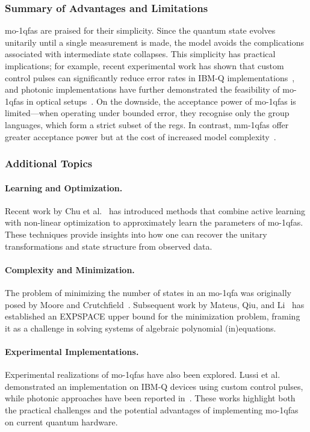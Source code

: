 \subsubsection{Summary of Advantages and Limitations}
\glspl{mo-1qfa} are praised for their simplicity. Since the quantum state evolves unitarily until a single measurement is made, the model avoids the complications associated with intermediate state collapses. This simplicity has practical implications; for example, recent experimental work has shown that custom control pulses can significantly reduce error rates in IBM-Q implementations~\cite{lussi2024implementing}, and photonic implementations have further demonstrated the feasibility of \glspl{mo-1qfa} in optical setups~\cite{candeloro2021enhanced}. On the downside, the acceptance power of \glspl{mo-1qfa} is limited—when operating under bounded error, they recognise only the group languages, which form a strict subset of the \glspl{reg}. In contrast, \glspl{mm-1qfa} offer greater acceptance power but at the cost of increased model complexity~\cite{kondacs1997power,berzicna2001ambainis}.


\subsubsection{Additional Topics}
\paragraph{Learning and Optimization.} Recent work by Chu et al.~\cite{chu2023approximately} has introduced methods that combine active learning with non-linear optimization to approximately learn the parameters of \glspl{mo-1qfa}. These techniques provide insights into how one can recover the unitary transformations and state structure from observed data.

\paragraph{Complexity and Minimization.} The problem of minimizing the number of states in an \gls{mo-1qfa} was originally posed by Moore and Crutchfield~\cite{moore2000quantum}. Subsequent work by Mateus, Qiu, and Li~\cite{mateus2012complexity} has established an EXPSPACE upper bound for the minimization problem, framing it as a challenge in solving systems of algebraic polynomial (in)equations.

\paragraph{Experimental Implementations.} Experimental realizations of \glspl{mo-1qfa} have also been explored. Lussi et al.~\cite{lussi2024implementing} demonstrated an implementation on IBM-Q devices using custom control pulses, while photonic approaches have been reported in~\cite{candeloro2021enhanced}. These works highlight both the practical challenges and the potential advantages of implementing \glspl{mo-1qfa} on current quantum hardware.


